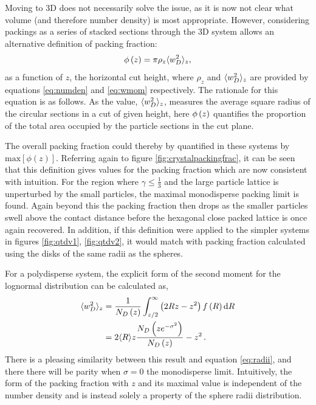 Moving to 3D does not necessarily solve the issue, as it is now not clear what volume (and therefore number density) is most appropriate.
However, considering \qtd{} packings as a series of stacked sections through the 3D system allows an alternative definition of packing fraction:
\begin{equation}
	\label{eq:altpackingfrac}
	\phi\left(z\right) = \pi\rho_z\langle w_D^2 \rangle_z,
\end{equation}
as a function of $z$, the horizontal cut height, where $\rho_z$ and $\langle w_D^2 \rangle_z$ are provided by equations \eqref{eq:numden} and \eqref{eq:wmom} respectively.
The rationale for this equation is as follows. 
As the value, $\langle w_D^2 \rangle_z$, measures the average square radius of the circular sections in a cut of given height, here $\phi\left(z\right)$ quantifies the proportion of the total area occupied by the particle sections in the cut plane.

The overall packing fraction could thereby by quantified in these systems by $\text{max}\left[\phi\left(z\right)\right]$.
Referring again to figure \ref{fig:crystalpackingfrac}, it can be seen that this definition gives values for the packing fraction which are now consistent with intuition.
For the region where $\gamma\leq\frac{1}{3}$ and the large particle lattice is unperturbed by the small particles, the maximal monodisperse packing limit is found.
Again beyond this the packing fraction then drops as the smaller particles swell above the contact distance before the hexagonal close packed lattice is once again recovered.
In addition, if this definition were applied to the simpler systems in figures \ref{fig:qtdv1}, \ref{fig:qtdv2}, it would match with packing fraction calculated using the disks of the same radii as the spheres. 

For a polydisperse system, the explicit form of the second moment for the lognormal distribution can be calculated as,
\begin{align}
	\label{eq:wiid}
	\langle w_D^2 \rangle_z &= \frac{1}{N_D\left(z\right)}\int_{z/2}^\infty  \left(2Rz-z^2\right) f\left(R\right) \text{d} R \nonumber \\
	&= 2\langle R\rangle z\frac{N_D\left(ze^{-\sigma^2}\right)}{N_D\left(z\right)}-z^2\,.
\end{align}
There is a pleasing similarity between this result and equation \eqref{eq:radii}, and there there will be parity when $\sigma=0$ \ie{} the monodisperse limit. 
Intuitively, the form of the packing fraction with $z$ and its maximal value is independent of the number density and is instead solely a property of the sphere radii distribution. 

